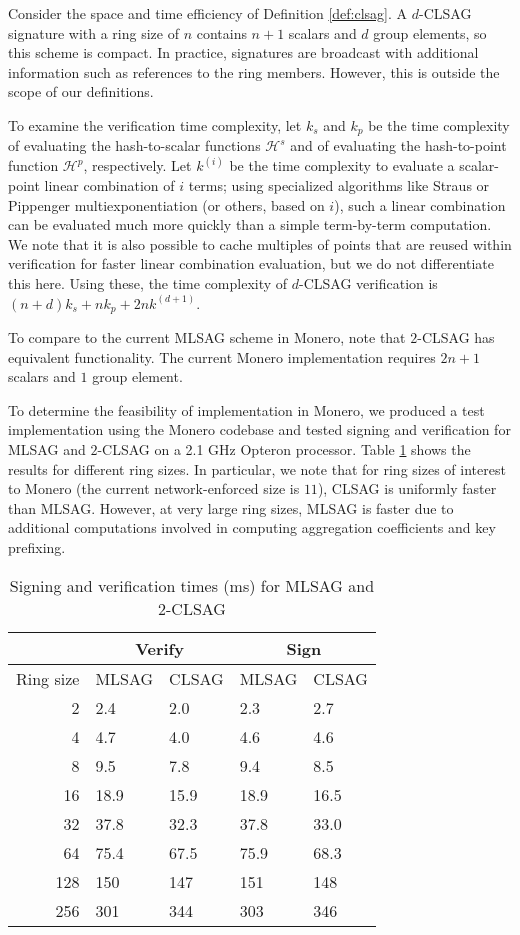 \documentclass{article}
\theoremstyle{plain}
\theoremstyle{definition}
\begin{document}
Consider the space and time efficiency of Definition \ref{def:clsag}. A $d$-CLSAG signature with a ring size of $n$ contains $n+1$ scalars and $d$ group elements, so this scheme is compact. In practice, signatures are broadcast with additional information such as references to the ring members. However, this is outside the scope of our definitions.

To examine the verification time complexity, let $k_s$ and $k_p$ be the time complexity of evaluating the hash-to-scalar functions $\mathcal{H}^s$ and of evaluating the hash-to-point function $\mathcal{H}^p$, respectively. Let $k^{(i)}$ be the time complexity to evaluate a scalar-point linear combination of $i$ terms; using specialized algorithms like Straus or Pippenger multiexponentiation (or others, based on $i$), such a linear combination can be evaluated much more quickly than a simple term-by-term computation. We note that it is also possible to cache multiples of points that are reused within verification for faster linear combination evaluation, but we do not differentiate this here. Using these, the time complexity of $d$-CLSAG verification is $(n+d)k_s + nk_p + 2nk^{(d+1)}$.

To compare to the current MLSAG scheme in Monero, note that $2$-CLSAG has equivalent functionality. The current Monero implementation requires $2n+1$ scalars and $1$ group element. 

To determine the feasibility of implementation in Monero, we produced a test implementation using the Monero codebase and tested signing and verification for MLSAG and $2$-CLSAG on a 2.1 GHz Opteron processor. Table \ref{table:timing} shows the results for different ring sizes. In particular, we note that for ring sizes of interest to Monero (the current network-enforced size is $11$), CLSAG is uniformly faster than MLSAG. However, at very large ring sizes, MLSAG is faster due to additional computations involved in computing aggregation coefficients and key prefixing.

\begin{table}[htp]
\begin{center}
\begin{tabular}{r|ll|ll}
& \multicolumn{2}{c|}{Verify} & \multicolumn{2}{c}{Sign} \\
\hline
Ring size & MLSAG & CLSAG & MLSAG & CLSAG \\
\hline
2 & 2.4 & 2.0 & 2.3 & 2.7 \\
4 & 4.7 & 4.0 & 4.6 & 4.6 \\
8 & 9.5 & 7.8 & 9.4 & 8.5 \\
16 & 18.9 & 15.9 & 18.9 & 16.5 \\
32 & 37.8 & 32.3 & 37.8 & 33.0 \\
64 & 75.4 & 67.5 & 75.9 & 68.3 \\
128 & 150 & 147 & 151 & 148 \\
256 & 301 & 344 & 303 & 346
\end{tabular}
\end{center}
\caption{Signing and verification times (ms) for MLSAG and $2$-CLSAG}
\label{table:timing}
\end{table}
\end{document}
